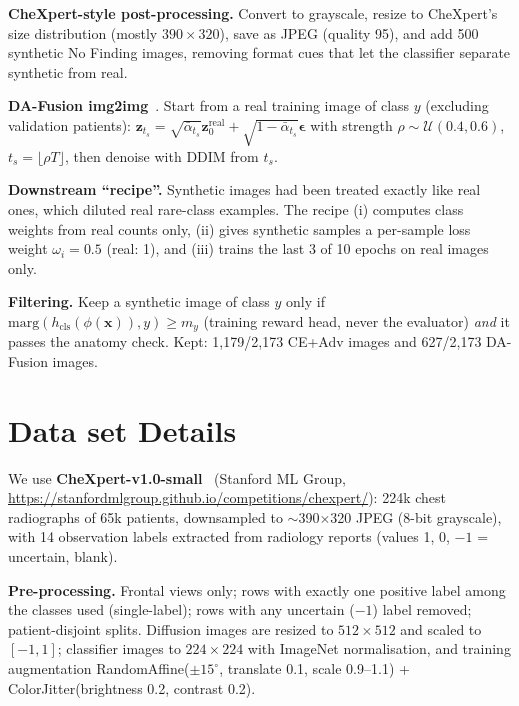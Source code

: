 \documentclass[twoside,english]{article}
\newcommand{\x}{\mathbf{x}}
\newcommand{\z}{\mathbf{z}}
\newcommand{\eps}{\boldsymbol{\epsilon}}
\newcommand{\abar}{\bar\alpha}
\begin{document}
\textbf{CheXpert-style post-processing.} Convert to grayscale, resize to CheXpert's size distribution (mostly $390\times320$), save as JPEG (quality 95), and add 500 synthetic No Finding images, removing format cues that let the classifier separate synthetic from real.

\textbf{DA-Fusion img2img}~\citep{trabucco2024dafusion}. Start from a real training image of class $y$ (excluding validation patients): $\z_{t_s}=\sqrt{\abar_{t_s}}\z_0^{\text{real}}+\sqrt{1-\abar_{t_s}}\eps$ with strength $\rho\sim\mathcal U(0.4,0.6)$, $t_s=\lfloor\rho T\rfloor$, then denoise with DDIM from $t_s$.

\textbf{Downstream ``recipe''.} Synthetic images had been treated exactly like real ones, which diluted real rare-class examples. The recipe (i) computes class weights from real counts only, (ii) gives synthetic samples a per-sample loss weight $\omega_i=0.5$ (real: 1), and (iii) trains the last 3 of 10 epochs on real images only.

\textbf{Filtering.} Keep a synthetic image of class $y$ only if $\text{marg}(h_{\text{cls}}(\phi(\x)),y)\ge m_y$ (training reward head, never the evaluator) \emph{and} it passes the anatomy check. Kept: 1{,}179/2{,}173 CE+Adv images and 627/2{,}173 DA-Fusion images.

\section{Data set Details}\label{sec:data}
We use \textbf{CheXpert-v1.0-small}~\citep{irvin2019chexpert} (Stanford ML Group, \url{https://stanfordmlgroup.github.io/competitions/chexpert/}): 224k chest radiographs of 65k patients, downsampled to $\sim$390$\times$320 JPEG (8-bit grayscale), with 14 observation labels extracted from radiology reports (values 1, 0, $-1$ = uncertain, blank).

\textbf{Pre-processing.} Frontal views only; rows with exactly one positive label among the classes used (single-label); rows with any uncertain ($-1$) label removed; patient-disjoint splits. Diffusion images are resized to $512\times512$ and scaled to $[-1,1]$; classifier images to $224\times224$ with ImageNet normalisation, and training augmentation RandomAffine($\pm15^\circ$, translate 0.1, scale 0.9--1.1) + ColorJitter(brightness 0.2, contrast 0.2).
\end{document}
